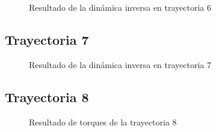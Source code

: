         \begin{figure}[h]
            \centering
            
            \caption{Resultado de la dinámica inversa en trayectoria 6}
            \label{f:cap7_tray6}
        \end{figure}
        
        \newpage


    \subsection{Trayectoria 7}
    
        \begin{figure}[h]
            \centering
            
            \caption{Resultado de la dinámica inversa en trayectoria 7}
            \label{f:cap7_tray7}
        \end{figure}


    \subsection{Trayectoria 8}
    
        \begin{figure}[h]
            \centering
            
            \caption{Resultado de torques de la trayectoria 8}
            \label{f:cap7_tray8}
        \end{figure}
        
        \newpage
        
\newpage
